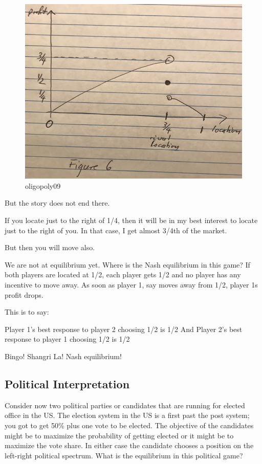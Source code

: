 \documentclass[
]{book}
\begin{document}
\begin{figure}

{\centering \includegraphics[width=0.5\linewidth]{img/oligopoly/fig9} 

}

\caption{oligopoly09}\label{fig:oligopoly09}
\end{figure}

But the story does not end there.

If you locate just to the right of 1/4, then it will be in my best interest to locate just to the right of you. In that case, I get almost 3/4th of the market.

\begin{center}
But then you will move also.

\end{center}

We are not at equilibrium yet.
Where is the Nash equilibrium in this game?
If both players are located at 1/2, each player gets 1/2 and no player has any incentive to move away. As soon as player 1, say moves away from 1/2, player 1s profit drops.

This is to say:

\begin{center}
Player 1's best response to player 2 choosing 1/2 is 1/2
And
Player 2's best response to player 1 choosing 1/2 is 1/2

\end{center}

Bingo!
Shangri La!
Nash equilibrium!

\hypertarget{political-interpretation}{%
\subsection{Political Interpretation}\label{political-interpretation}}

Consider now two political parties or candidates that are running for elected office in the US. The election system in the US is a first past the post system; you got to get 50\% plus one vote to be elected. The objective of the candidates might be to maximize the probability of getting elected or it might be to maximize the vote share. In either case the candidate chooses a position on the left-right political spectrum. What is the equilibrium in this political game?
\end{document}
